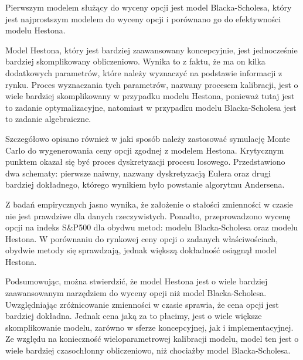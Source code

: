 \documentclass{pracamgr}
\begin{document}
Pierwszym modelem służący do wyceny opcji jest model Blacka-Scholesa, który jest
najprostszym modelem do wyceny opcji i porównano go do efektywności modelu 
Hestona. 

Model Hestona, który jest bardziej zaawansowany koncepcyjnie, jest jednocześnie 
bardziej skomplikowany obliczeniowo. Wynika to z faktu, że ma on kilka dodatkowych
parametrów, które należy wyznaczyć na podstawie informacji z rynku. Proces wyznaczania tych 
parametrów, nazwany procesem kalibracji, jest o wiele bardziej skomplikowany w przypadku 
modelu Hestona, ponieważ tutaj jest to zadanie optymalizacyjne, natomiast w przypadku modelu
Blacka-Scholesa jest to zadanie algebraiczne.

Szczegółowo opisano również w jaki sposób należy zastosować symulację Monte Carlo do 
wygenerowania ceny opcji zgodnej z modelem Hestona. Krytycznym punktem okazał się być
proces dyskretyzacji procesu losowego. Przedstawiono dwa schematy: pierwsze naiwny, nazwany
dyskretyzacją Eulera oraz drugi bardziej dokładnego, którego wynikiem było powstanie 
algorytmu Andersena. 

Z badań empirycznych jasno wynika, że założenie o stałości zmienności w czasie nie jest 
prawdziwe dla danych rzeczywistych. Ponadto, przeprowadzono wycenę opcji na indeks 
S\&P500 dla obydwu metod: modelu Blacka-Scholesa oraz modelu Hestona. 
W porównaniu do rynkowej ceny opcji o zadanych właściwościach, obydwie metody się 
sprawdzają, jednak większą dokładność osiągnął model Hestona.


Podsumowując, można stwierdzić, że model Hestona jest o wiele bardziej zaawansowanym
narzędziem do wyceny opcji niż model Blacka-Scholesa. Uwzględniając zróżnicowanie zmienności 
w czasie sprawia, że cena opcji jest bardziej dokładna. Jednak cena jaką za to płacimy,
jest o wiele większe skomplikowanie modelu, zarówno w sferze koncepcyjnej, jak i 
implementacyjnej. Ze względu na konieczność wieloparametrowej kalibracji modelu, 
model ten jest o wiele bardziej czasochłonny obliczeniowo, niż chociażby model Blacka-Scholesa.


\appendix

\listoffigures 
{} 
 
\listoflistings
\printbibliography
\printindex 
\end{document}
